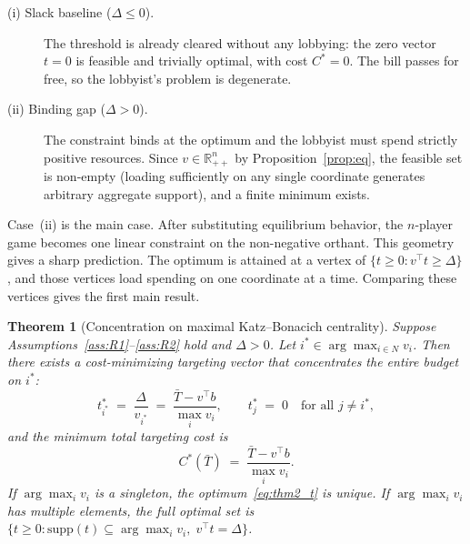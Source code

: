 \documentclass[11pt,letterpaper]{article}
\theoremstyle{plain}
\newtheorem{theorem}{Theorem}
\theoremstyle{definition}
\theoremstyle{remark}
\begin{document}
\begin{description}
\item[(i) Slack baseline ($\Delta \leq 0$).] The threshold is already cleared without any lobbying: the zero vector $t = 0$ is feasible and trivially optimal, with cost $C^* = 0$. The bill passes for free, so the lobbyist's problem is degenerate.

\item[(ii) Binding gap ($\Delta > 0$).] The constraint binds at the optimum and the lobbyist must spend strictly positive resources. Since $v \in \mathbb{R}^n_{++}$ by Proposition~\ref{prop:eq}, the feasible set is non-empty (loading sufficiently on any single coordinate generates arbitrary aggregate support), and a finite minimum exists.
\end{description}

Case~(ii) is the main case. After substituting equilibrium behavior, the $n$-player game becomes one linear constraint on the non-negative orthant. This geometry gives a sharp prediction. The optimum is attained at a vertex of $\{t \geq 0 : v^\top t \geq \Delta\}$, and those vertices load spending on one coordinate at a time. Comparing these vertices gives the first main result.

\begin{theorem}[Concentration on maximal Katz--Bonacich centrality]\label{thm:concentration}
Suppose Assumptions~\ref{ass:R1}--\ref{ass:R2} hold and $\Delta > 0$. Let $i^* \in \arg\max_{i \in N} v_i$. Then there exists a cost-minimizing targeting vector that concentrates the entire budget on $i^*$:
\begin{equation}
t^*_{i^*} \;=\; \frac{\Delta}{v_{i^*}} \;=\; \frac{\bar T - v^\top b}{\max_{i} v_i}, \qquad t^*_j \;=\; 0 \quad\text{for all } j \neq i^*,
\label{eq:thm2_t}
\end{equation}
and the minimum total targeting cost is
\begin{equation}
C^*(\bar T) \;=\; \frac{\bar T - v^\top b}{\max_{i} v_i}.
\label{eq:thm2_cost}
\end{equation}
If $\arg\max_i v_i$ is a singleton, the optimum~\eqref{eq:thm2_t} is unique. If $\arg\max_i v_i$ has multiple elements, the full optimal set is $\{t \geq 0 : \mathrm{supp}(t) \subseteq \arg\max_i v_i,\; v^\top t = \Delta\}$.
\end{theorem}
\end{document}
